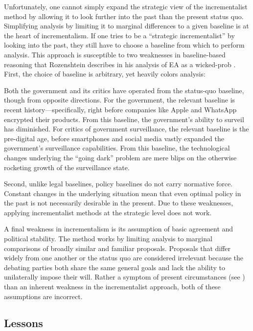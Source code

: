 Unfortunately, one cannot simply expand the strategic view of the incrementalist method by allowing it to look further
into the past than the present status quo. Simplifying analysis by limiting it to marginal differences to a given
baseline is at the heart of \ac{incrementalism}. If one tries to be a ``strategic incrementalist'' by looking into the
past, they still have to choose a baseline from which to perform analysis. This approach is susceptible to two
weaknesses in baseline-based reasoning that Rozenshtein describes in his analysis of \ac{EA} as a \ac{wicked-prob}
\cite{rozenshtein_wicked_2018}. First, the choice of baseline is arbitrary, yet heavily colors analysis:

\begin{displayquote}
Both the government and its critics have operated from the status-quo baseline, though from opposite directions. For the
government, the relevant baseline is recent history---specifically, right before companies like Apple and WhatsApp
encrypted their products. From this baseline, the government's ability to surveil has diminished. For critics of
government surveillance, the relevant baseline is the pre-digital age, before smartphones and social media vastly
expanded the government's surveillance capabilities. From this baseline, the technological changes underlying the
``going dark'' problem are mere blips on the otherwise rocketing growth of the surveillance state.
\cite{rozenshtein_wicked_2018}
\end{displayquote}

Second, unlike legal baselines, policy baselines do not carry normative force. Constant changes in the underlying
situation mean that even optimal policy in the past is not necessarily desirable in the present. Due to these
weaknesses, applying incrementalist methods at the strategic level does not work.

A final weakness in \ac{incrementalism} is its assumption of basic agreement and political stability. The method works
by limiting analysis to marginal comparisons of broadly similar and familiar proposals. Proposals that differ widely
from one another or the status quo are considered irrelevant because the debating parties both share the same general
goals and lack the ability to unilaterally impose their will. Rather a symptom of present circumstances (see
) than an inherent weakness in the incrementalist approach, both of these assumptions are
incorrect.


\subsection{Lessons}
\label{sec-policy-lessons}

